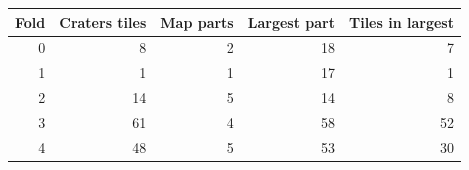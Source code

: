 \begin{tabular}{rrrrr}
\hline
Fold & Craters tiles & Map parts & Largest part & Tiles in largest \\
\hline
0 & 8 & 2 & 18 & 7 \\
1 & 1 & 1 & 17 & 1 \\
2 & 14 & 5 & 14 & 8 \\
3 & 61 & 4 & 58 & 52 \\
4 & 48 & 5 & 53 & 30 \\
\hline
\end{tabular}
